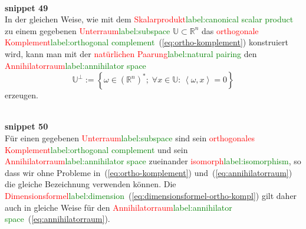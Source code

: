 \documentclass[a4paper,twoside,english,ngerman,deutsch,german,sectrefs,envcountsame,envcountchap]{svmono}
\newcommand{\setref}[2]{\textcolor{red}{#1}\textcolor{green}{#2}}
\newcommand{\snippet}[1]{\\\textbf{snippet #1}\\}
\begin{document}
\snippet{49}
In der gleichen Weise, wie mit dem \setref{Skalarprodukt}{label:canonical scalar product} zu einem gegebenen \setref{Unterraum}{label:subspace} $\mathbb{U}\subset{\mathbb{R}}^{n}$ das \setref{orthogonale Komplement}{label:orthogonal complement}~(\ref{eq:ortho-komplement}) konstruiert wird, kann man mit der \setref{natürlichen Paarung}{label:natural pairing} den \setref{Annihilatorraum}{label:annihilator space}
\begin{equation}
\mathbb{U}^{\perp}:=\left\{ \omega\in({\mathbb{R}}^{n})^{*};\;\forall x\in\mathbb{U}:\,\left\langle \omega,x\right\rangle =0\right\} \label{eq:annihilatorraum}
\end{equation}
erzeugen.

\snippet{50}
Für einen gegebenen \setref{Unterraum}{label:subspace} sind sein \setref{orthogonales Komplement}{label:orthogonal complement} und sein \setref{Annihilatorraum}{label:annihilator space} zueinander \setref{isomorph}{label:isomorphism}, so dass wir ohne Probleme in~(\ref{eq:ortho-komplement}) und~(\ref{eq:annihilatorraum}) die gleiche Bezeichnung verwenden können. Die \setref{Dimensionsformel}{label:dimension}~(\ref{eq:dimensionsformel-ortho-kompl}) gilt daher auch in gleiche Weise für den \setref{Annihilatorraum}{label:annihilator space}~(\ref{eq:annihilatorraum}).
\end{document}
